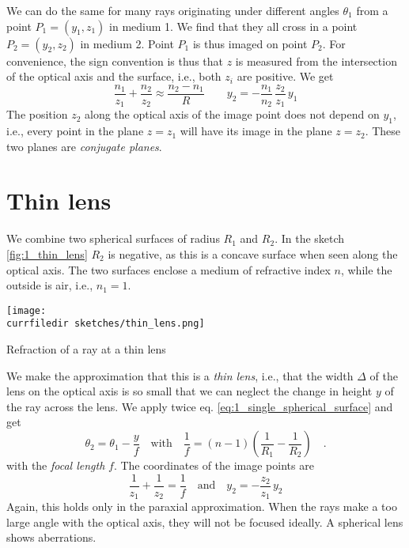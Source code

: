 We can do the same for many rays originating under different angles $\theta_1$ from  a point $P_1 =(y_1, z_1)$ in medium 1. We find that they all cross in a point $P_2 = (y_2, z_2)$ in medium 2. Point $P_1$ is thus imaged on point $P_2$. For convenience, the sign convention is thus that $z$ is measured from the intersection of the optical axis and the surface, i.e., both $z_i$ are positive.
We get
\begin{equation}
    \frac{n_1}{z_1} + \frac{n_2}{z_2} \approx \frac{n_2 - n_1}{R} \qquad 
    y_2 = - \frac{n_1}{n_2} \, \frac{z_2}{z_1} \, y_1
\end{equation}
The position $z_2$ along the optical axis of the image point does not depend on $y_1$, i.e., every point in the plane $z=z_1$ will have its image in the plane $z = z_2$. These two planes are \emph{conjugate planes}.




\section{Thin lens}

We combine two spherical surfaces of radius $R_1$ and $R_2$. In the sketch \ref{fig:1_thin_lens} $R_2$ is negative, as this is a concave surface when seen along the optical axis. The two surfaces enclose a medium of refractive index $n$, while the outside is air, i.e., $n_1 = 1$.

\begin{marginfigure}
    \texttt{[image: \\currfiledir sketches/thin\_lens.png]}
   \caption{Refraction of  a ray at a thin lens}
   \label{fig:1_thin_lens}
\end{marginfigure}


We make the approximation that this is a \emph{thin lens}, i.e., that the width $\Delta$ of the lens on the optical axis is so small that we can neglect the change in height $y$ of the ray across the lens. We apply twice eq. \ref{eq:1_single_spherical_surface} and get
\begin{equation}
    \theta_2 = \theta_1 - \frac{y}{f} \quad \text{with} \quad
   \frac{1}{f} = (n-1) \left( \frac{1}{R_1} - \frac{1}{R_2} \right) \quad . 
\end{equation}
with the \emph{focal length} $f$. The coordinates of the image points are
\begin{equation}
    \frac{1}{z_1} + \frac{1}{z_2} = \frac{1}{f} \quad \text{and} \quad 
    y_2 = - \frac{z_2}{z_1} \, y_2
\end{equation}
Again, this holds only in the paraxial approximation. When the rays make a too large angle with the optical axis, they will not be focused ideally. A spherical lens shows aberrations.

